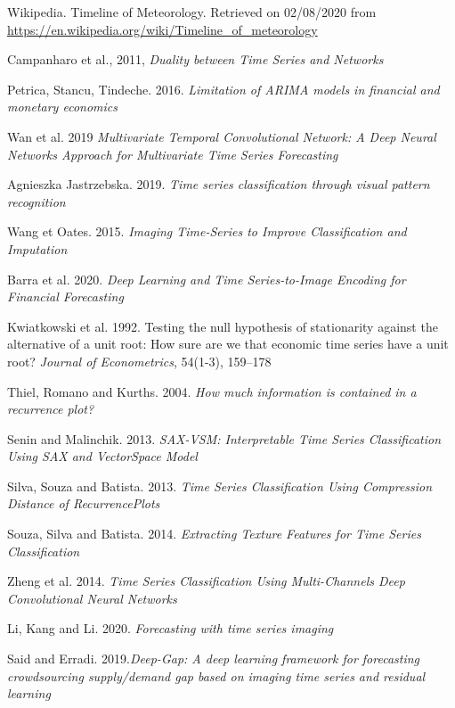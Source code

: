 \documentclass[11pt]{article}
\begin{document}
\begin{onehalfspace}
\begin{thebibliography}{9}
    Wikipedia. Timeline of Meteorology. Retrieved on 02/08/2020 from \url{https://en.wikipedia.org/wiki/Timeline_of_meteorology}

    Campanharo et al., 2011, \textit{Duality between Time Series and Networks}

    Petrica, Stancu, Tindeche. 2016. \textit{Limitation of ARIMA models in financial and monetary economics}

    Wan et al. 2019 \textit{Multivariate Temporal Convolutional Network: A Deep Neural Networks Approach for Multivariate Time Series Forecasting}

    Agnieszka Jastrzebska. 2019. \textit{Time series classification through visual pattern recognition}

    Wang et Oates. 2015. \textit{Imaging Time-Series to Improve Classification and Imputation}

    Barra et al. 2020. \textit{Deep Learning and Time Series-to-Image Encoding for Financial Forecasting}

    Kwiatkowski et al. 1992. Testing the null hypothesis of stationarity against the alternative of a unit root: How sure are we that economic time series have a unit root? \textit{Journal of Econometrics}, 54(1-3), 159–178

    Thiel, Romano and Kurths. 2004. \textit{How much information is contained in a recurrence plot?}

    Senin and Malinchik. 2013. \textit{SAX-VSM: Interpretable Time Series Classification Using SAX and VectorSpace Model}

    Silva, Souza and Batista. 2013. \textit{ Time  Series  Classification  Using  Compression  Distance  of  RecurrencePlots}

    Souza, Silva and Batista. 2014. \textit{Extracting Texture Features for Time Series Classification}

    Zheng et al. 2014. \textit{Time Series Classification Using Multi-Channels Deep Convolutional Neural Networks}

    Li, Kang and Li. 2020. \textit{Forecasting with time series imaging}

    Said and Erradi. 2019.\textit{Deep-Gap: A deep learning framework for forecasting crowdsourcing supply/demand  gap  based  on  imaging  time  series  and  residual  learning}


\end{thebibliography}
\end{onehalfspace}
\end{document}
